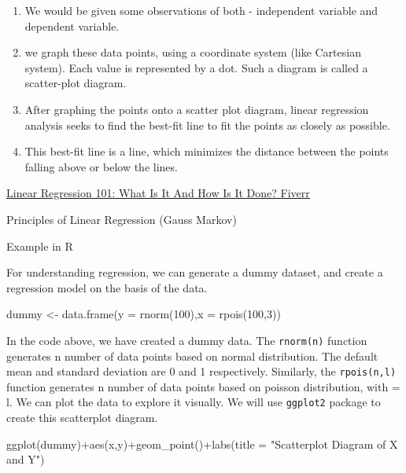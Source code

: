 \documentclass[
  letterpaper,
  twoside,
  openright,
  headsepline,
  footsepline,
  listof = totocnumbered,
  chapterprefix = true,
  titlepage = false]{scrbook}
\newenvironment{Shaded}{\begin{snugshade}}{\end{snugshade}}
\newcommand{\AttributeTok}[1]{\textcolor[rgb]{0.40,0.45,0.13}{#1}}
\newcommand{\DecValTok}[1]{\textcolor[rgb]{0.68,0.00,0.00}{#1}}
\newcommand{\FunctionTok}[1]{\textcolor[rgb]{0.28,0.35,0.67}{#1}}
\newcommand{\NormalTok}[1]{\textcolor[rgb]{0.00,0.23,0.31}{#1}}
\newcommand{\OtherTok}[1]{\textcolor[rgb]{0.00,0.23,0.31}{#1}}
\newcommand{\SpecialCharTok}[1]{\textcolor[rgb]{0.37,0.37,0.37}{#1}}
\newcommand{\StringTok}[1]{\textcolor[rgb]{0.13,0.47,0.30}{#1}}
\begin{document}
\begin{enumerate}
\def\labelenumi{\arabic{enumi}.}
\item
  We would be given some observations of both - independent variable and
  dependent variable.
\item
  we graph these data points, using a coordinate system (like Cartesian
  system). Each value is represented by a dot. Such a diagram is called
  a scatter-plot diagram.
\item
  After graphing the points onto a scatter plot diagram, linear
  regression analysis seeks to find the best-fit line to fit the points
  as closely as possible.
\item
  This best-fit line is a line, which minimizes the distance between the
  points falling above or below the lines.
\end{enumerate}

\href{https://www.fiverr.com/resources/guides/data/linear-regression-101}{Linear
Regression 101: What Is It And How Is It Done? \textbar{} Fiverr}

Principles of Linear Regression (Gauss Markov)

Example in R

For understanding regression, we can generate a dummy dataset, and
create a regression model on the basis of the data.

\begin{Shaded}
\begin{Highlighting}[numbers=left,,]
\NormalTok{dummy }\OtherTok{\textless{}{-}} \FunctionTok{data.frame}\NormalTok{(}\AttributeTok{y =} \FunctionTok{rnorm}\NormalTok{(}\DecValTok{100}\NormalTok{),}\AttributeTok{x =} \FunctionTok{rpois}\NormalTok{(}\DecValTok{100}\NormalTok{,}\DecValTok{3}\NormalTok{))}
\end{Highlighting}
\end{Shaded}

In the code above, we have created a dummy data. The \texttt{rnorm(n)}
function generates n number of data points based on normal distribution.
The default mean and standard deviation are 0 and 1 respectively.
Similarly, the \texttt{rpois(n,l)} function generates n number of data
points based on poisson distribution, with \lambda = l. We can plot the
data to explore it visually. We will use \texttt{ggplot2} package to
create this scatterplot diagram.

\begin{Shaded}
\begin{Highlighting}[numbers=left,,]
\FunctionTok{ggplot}\NormalTok{(dummy)}\SpecialCharTok{+}\FunctionTok{aes}\NormalTok{(x,y)}\SpecialCharTok{+}\FunctionTok{geom\_point}\NormalTok{()}\SpecialCharTok{+}\FunctionTok{labs}\NormalTok{(}\AttributeTok{title =} \StringTok{"Scatterplot Diagram of X and Y"}\NormalTok{)}
\end{Highlighting}
\end{Shaded}
\end{document}
